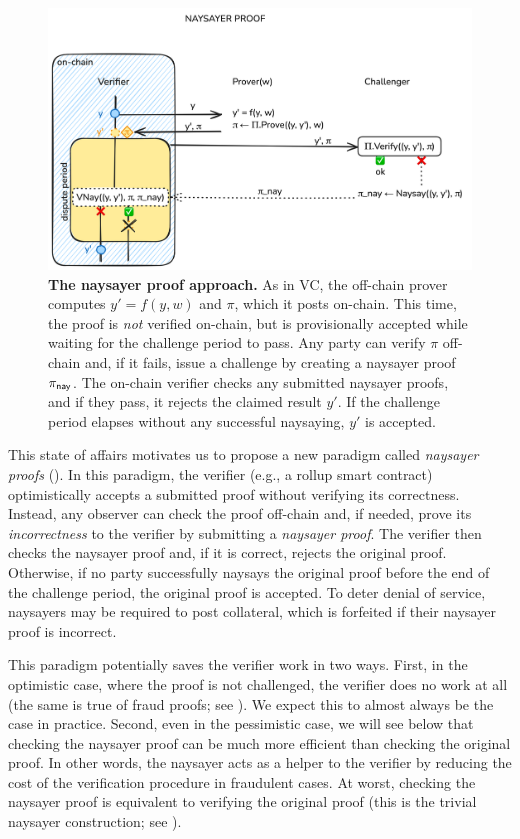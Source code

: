  \begin{figure}[tb]
    \includegraphics[width=\textwidth]{naysayer/figs/naysayer.png}
    \caption{\textbf{The naysayer proof approach.} As in VC, the off-chain prover computes $y' = f(y, w)$ and $\pi$, which it posts on-chain. This time, the proof is \emph{not} verified on-chain, but is provisionally accepted while waiting for the challenge period to pass. Any party can verify $\pi$ off-chain and, if it fails, issue a challenge by creating a naysayer proof $\pi_{\mathsf{nay}}$. The on-chain verifier checks any submitted naysayer proofs, and if they pass, it rejects the claimed result $y'$. If the challenge period elapses without any successful naysaying, $y'$ is accepted.}
    \label{fig:naysayer}
 \end{figure}

This state of affairs motivates us to propose a new paradigm called \emph{naysayer proofs} (). In this paradigm, the verifier (e.g., a rollup smart contract) optimistically accepts a submitted proof without verifying its correctness. Instead, any observer can check the proof off-chain and, if needed, prove its \emph{incorrectness} to the verifier by submitting a \emph{naysayer proof}. The verifier then checks the naysayer proof and, if it is correct, rejects the original proof.
Otherwise, if no party successfully naysays the original proof before the end of the challenge period, the original proof is accepted.
To deter denial of service, naysayers may be required to post collateral, which is forfeited if their naysayer proof is incorrect.

This paradigm potentially saves the verifier work in two ways. 
First, in the optimistic case, where the proof is not challenged, the verifier does no work at all (the same is true of fraud proofs; see ). We expect this to almost always be the case in practice. Second, even in the pessimistic case, we will see below that checking the naysayer proof can be much more efficient than checking the original proof.
In other words, the naysayer acts as a helper to the verifier by reducing the cost of the verification procedure in fraudulent cases. At worst, checking the naysayer proof is equivalent to verifying the original proof (this is the trivial naysayer construction; see ).

